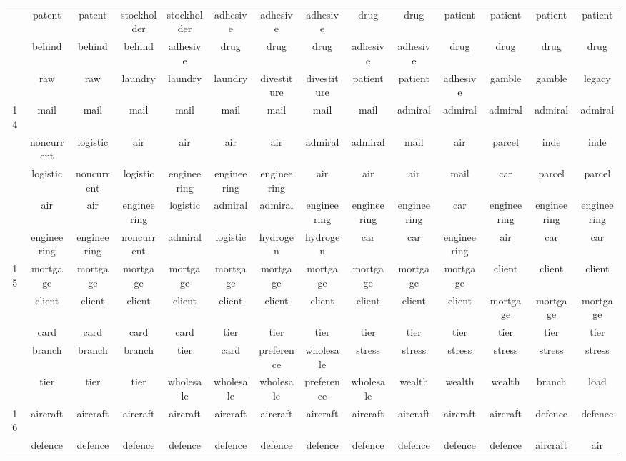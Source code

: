 \documentclass[12pt,journal,letterpaper,oneside,onecolumn]{IEEEtran}
\begin{document}
\begin{center}
{\begin{tabular}{c|c|c|c|c|c|c|c|c|c|c|c|c|c}
         & patent & patent & stockholder & stockholder & adhesive & adhesive & adhesive & drug & drug & patient & patient & patient & patient \\ 
         & behind & behind & behind & adhesive & drug & drug & drug & adhesive & adhesive & drug & drug & drug & drug \\ 
         & raw & raw & laundry & laundry & laundry & divestiture & divestiture & patient & patient & adhesive & gamble & gamble & legacy \\ 
        \hline
        14 & mail & mail & mail & mail & mail & mail & mail & mail & admiral & admiral & admiral & admiral & admiral \\ 
         & noncurrent & logistic & air & air & air & air & admiral & admiral & mail & air & parcel & inde & inde \\ 
         & logistic & noncurrent & logistic & engineering & engineering & engineering & air & air & air & mail & car & parcel & parcel \\ 
         & air & air & engineering & logistic & admiral & admiral & engineering & engineering & engineering & car & engineering & engineering & engineering \\ 
         & engineering & engineering & noncurrent & admiral & logistic & hydrogen & hydrogen & car & car & engineering & air & car & car \\ 
        \hline
        15 & mortgage & mortgage & mortgage & mortgage & mortgage & mortgage & mortgage & mortgage & mortgage & mortgage & client & client & client \\ 
         & client & client & client & client & client & client & client & client & client & client & mortgage & mortgage & mortgage \\ 
         & card & card & card & card & tier & tier & tier & tier & tier & tier & tier & tier & tier \\ 
         & branch & branch & branch & tier & card & preference & wholesale & stress & stress & stress & stress & stress & stress \\ 
         & tier & tier & tier & wholesale & wholesale & wholesale & preference & wholesale & wealth & wealth & wealth & branch & load \\ 
        \hline
        16 & aircraft & aircraft & aircraft & aircraft & aircraft & aircraft & aircraft & aircraft & aircraft & aircraft & aircraft & defence & defence \\ 
         & defence & defence & defence & defence & defence & defence & defence & defence & defence & defence & defence & aircraft & air \\ 

\end{tabular}}
\end{center}
\end{document}
